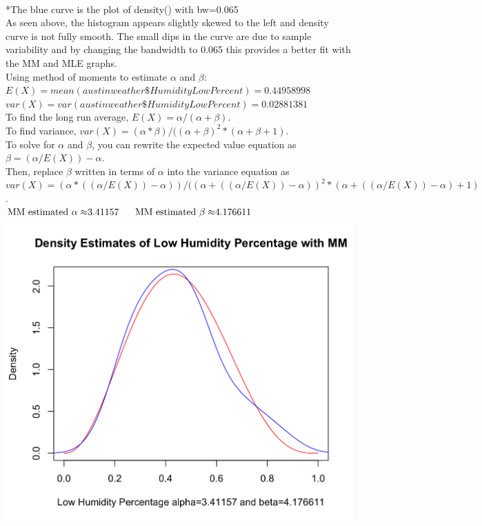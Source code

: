 \documentclass[12pt, letterpaper]{article}
\newcommand{\tab}{\hspace*{4ex}}
\begin{document}
\footnotesize
\\ \**The blue curve is the plot of density() with bw=0.065\\
As seen above, the histogram appears slightly skewed to the left and density curve is not fully smooth. The small dips in the curve are due to sample variability and by changing the bandwidth to 0.065 this provides a better fit with the MM and MLE graphs.\\
Using method of moments to estimate ${\alpha}$ and ${\beta}$:\\
$E(X) = mean(austinweather\$HumidityLowPercent) = 0.44958998$\\
$var(X) = var(austinweather\$HumidityLowPercent) = 0.02881381$\\
To find the long run average, $E(X) = {\alpha / (\alpha + \beta)}$.\\ 
To find variance, $var(X) = {(\alpha*\beta)/ ((\alpha + \beta)^2*(\alpha + \beta + 1)}$.\\
To solve for $\alpha$ and $\beta$, you can rewrite the expected value equation as $\beta = (\alpha/E(X)) - \alpha$. \\
Then, replace $\beta$ written in terms of $\alpha$ into the variance equation as \\ $var(X) = {(\alpha*((\alpha/E(X)) - \alpha))/ ((\alpha + ((\alpha/E(X)) - \alpha))^2*(\alpha + ((\alpha/E(X)) - \alpha) + 1)}$.\\ ${\text{MM estimated } \alpha \approx} 3.41157 \tab {\text{MM estimated } \beta \approx} 4.176611$\\
\includegraphics[scale=0.37]{austinweather_mm.png}
\end{document}
